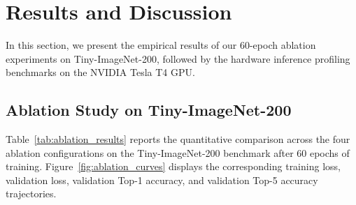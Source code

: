 \section{Results and Discussion}
\label{section:results_and_discussion}

In this section, we present the empirical results of our 60-epoch ablation experiments on Tiny-ImageNet-200, followed by the hardware inference profiling benchmarks on the NVIDIA Tesla T4 GPU.

\subsection{Ablation Study on Tiny-ImageNet-200}
\label{subsection:ablation_results}

Table~\ref{tab:ablation_results} reports the quantitative comparison across the four ablation configurations on the Tiny-ImageNet-200 benchmark after 60 epochs of training. Figure~\ref{fig:ablation_curves} displays the corresponding training loss, validation loss, validation Top-1 accuracy, and validation Top-5 accuracy trajectories.

\begin{table}[htbp]
\centering
\small
{}
\caption{Ablation study results on Tiny-ImageNet-200 (60 epochs): comparison between pure linear baseline, depthwise convolutional inductive biases, and stem configurations. All models are trained under identical conditions on dual Tesla T4 GPUs.}
\label{tab:ablation_results}
\end{table}


